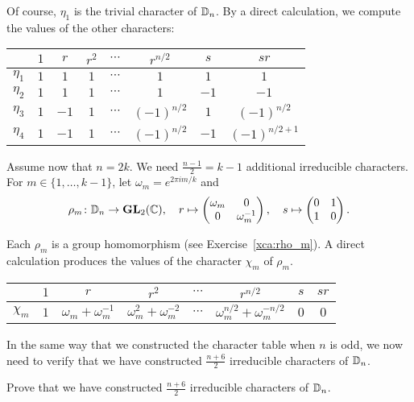 Of course, $\eta_1$ is the trivial character of $\mathbb{D}_n$. 
By a direct calculation, we compute the values of the other characters: 
\bigskip 
\begin{center}
    \begin{tabular}{|c|ccccccc|}
         \hline 
         & $1$ & $r$ & $r^2$ & $\cdots$  & $r^{n/2}$ & $s$ & $sr$\\
         \hline 
         $\eta_1$ & $1$ & $1$ & $1$ & $\cdots$ & $1$ & $1$ & $1$\\
         $\eta_2$ & $1$ & $1$ & $1$ & $\cdots$ & $1$ & $-1$ & $-1$ \\
         $\eta_3$ & $1$ & $-1$ & $1$ & $\cdots$ & $(-1)^{n/2}$ & $1$ & $(-1)^{n/2}$ \\
         $\eta_4$ & $1$ & $-1$ & $1$ & $\cdots$ & $(-1)^{n/2}$ & $-1$ & $(-1)^{n/2+1}$\\
         \hline 
    \end{tabular}
\end{center}
\bigskip 

Assume now that $n=2k$. 
We need $\frac{n-1}{2}=k-1$ additional irreducible characters. For 
$m\in\{1,\dots,k-1\}$, let $\omega_m=e^{2\pi im/k}$ and 
\[
\rho_m\colon\mathbb{D}_n\to\mathbf{GL}_2(\mathbb{C}),\quad 
r\mapsto\begin{pmatrix}\omega_m&0\\0&\omega_m^{-1}\end{pmatrix},\quad 
s\mapsto\begin{pmatrix}0&1\\1&0\end{pmatrix}.
\]

Each $\rho_m$ is a group homomorphism (see Exercise~\ref{xca:rho_m}). 
A direct calculation produces the values of the 
character $\chi_m$ of $\rho_m$.

\bigskip 
\begin{center}
    \begin{tabular}{|c|ccccccc|}
         \hline 
         & $1$ & $r$ & $r^2$ & $\cdots$  & $r^{n/2}$ & $s$ & $sr$\\
         \hline 
         $\chi_m$ & $1$ & $\omega_m+\omega_m^{-1}$ & $\omega_m^2+\omega_m^{-2}$ & $\cdots$ & $\omega_m^{n/2}+\omega_m^{-n/2}$ & $0$ & $0$\\
         \hline 
    \end{tabular}
\end{center}
\bigskip 

In the same way that we constructed the character table when $n$ is odd, 
we now need to verify that we have constructed 
$\frac{n+6}{2}$ irreducible characters of $\mathbb{D}_n$. 

\begin{exercise}
\label{xca:n_even}
    Prove that we have constructed $\frac{n+6}{2}$ irreducible characters of $\mathbb{D}_n$. 
\end{exercise}